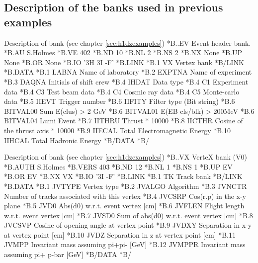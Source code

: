  
 
\finalnewpage

\subsection{Description of the banks used in previous examples}
\begin{XMPt}{Description of  bank (see chapter \ref{sec:h1dzexamples})}
*B..EV  Event header bank.
*B.AU    S.Holmes
*B.VE    402
*B.ND    10
*B.NL    2
*B.NS    2
*B.NX    None
*B.UP    None
*B.OR    None
*B.IO    '3H 3I -F'
*B.LINK
*B.1   VX       Vertex bank
*B/LINK
*B.DATA
*B.1   LABNA     Name of laboratory
*B.2   EXPTNA    Name of experiment
*B.3   DAQNA     Initials of shift crew 
*B.4   IHDAT     Data type
*B.4   C1        Experiment data
*B.4   C3        Test beam data
*B.4   C4        Cosmic ray data
*B.4   C5        Monte-carlo data
*B.5   IIEVT     Trigger number
*B.6   IIFITY    Filter type (Bit string)
*B.6   BITVAL00  Sum E(clus) > 2 GeV
*B.6   BITVAL01  E(EB cls/blk) > 200MeV
*B.6   BITVAL04  Lumi Event
*B.7   IITHRU    Thrust * 10000
*B.8   IICTHR    Cosine of the thrust axis * 10000
*B.9   IIECAL    Total Electromagnetic Energy
*B.10  IIHCAL    Total Hadronic Energy
*B/DATA
*B/
\end{XMPt}
\begin{XMPt}{Description of  bank (see chapter \ref{sec:h1dzexamples})}
*B..VX     VerteX bank (V0)
*B.AUTH    S.Holmes 
*B.VERS    403
*B.ND      12
*B.NL      1
*B.NS      1
*B.UP      EV
*B.OR      EV
*B.NX      VX
*B.IO      '3I -F'
*B.LINK
*B.1   TK       Track bank
*B/LINK
*B.DATA
*B.1   JVTYPE   Vertex type
*B.2   JVALGO   Algorithm
*B.3   JVNCTR   Number of tracks associated with this vertex
*B.4   JVCSRP   Cos(r.p) in the x-y plane
*B.5   JVD0     Abs(d0) w.r.t. event vertex            [cm]
*B.6   JVFLEN   Flight length w.r.t. event vertex      [cm]
*B.7   JVSD0    Sum of abs(d0) w.r.t. event vertex     [cm]
*B.8   JVCSVP   Cosine of opening angle at vertex point
*B.9   JVDXY    Separation in x-y at vertex point      [cm]
*B.10  JVDZ     Separation in z at vertex point        [cm]
*B.11  JVMPP    Invariant mass assuming pi+pi-        [GeV]
*B.12  JVMPPR   Invariant mass assuming pi+ p-bar     [GeV]
*B/DATA
*B/
\end{XMPt}
